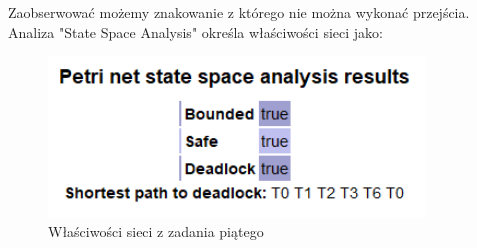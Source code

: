 \documentclass{article}
\begin{document}
        \FloatBarrier
        Zaobserwować możemy znakowanie z którego nie można wykonać przejścia.
        Analiza "State Space Analysis" określa właściwości sieci jako:
        \begin{figure}[h!]
            \centering
            \includegraphics[width=10cm]{lab6/n5_2.png}
            \caption{Właściwości sieci z zadania piątego}
        \end{figure}\\
        \FloatBarrier

        
\end{document}
